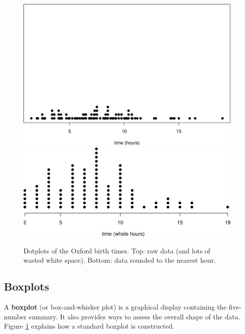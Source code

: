 \documentclass[
  11pt,
  british,
  openany, a4paper]{book}
\begin{document}
\begin{figure}

{\centering \includegraphics[width=0.75\linewidth]{images/ox_dot_basic} \includegraphics[width=0.75\linewidth]{images/ox_dot_adv} 

}

\caption{Dotplots of the Oxford birth times. Top: raw data (and lots of wasted white space).  Bottom: data rounded to the nearest hour.}\label{fig:oxdotbasic}
\end{figure}

\hypertarget{boxplots}{%
\subsection{Boxplots}\label{boxplots}}

A \textbf{boxplot} (or box-and-whisker plot) is a graphical display containing the five-number summary. It also provides ways to assess the overall shape of the data. Figure \ref{fig:oxdotbasic} explains how a standard boxplot is constructed.
\end{document}
